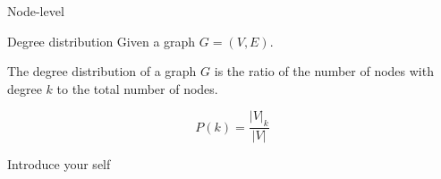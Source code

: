 \documentclass[aspectratio=169]{beamer}
\begin{document}
    \begin{frame}{Node-level}
        \begin{exampleblock}{Degree distribution}
            Given a graph $G = (V, E)$.
            
            The degree distribution of a graph $G$ is the ratio of the number of nodes with degree $k$ to the total number of nodes.
        \end{exampleblock}

        \begin{equation}
            P(k) = \frac{|V|_{k}}{|V|}
        \end{equation}
        

        \begin{note}
            {Introduce your self}
        \end{note}
    \end{frame}
\end{document}
